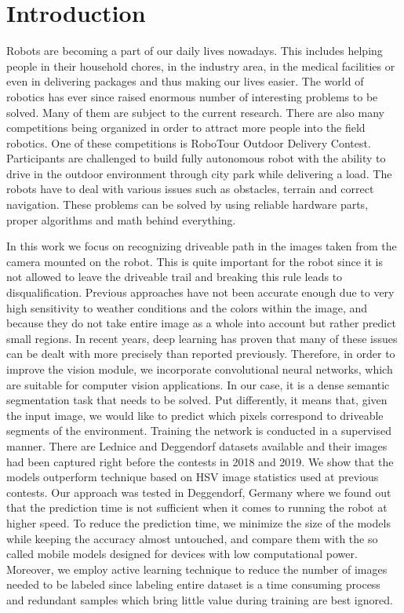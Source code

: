 \chapter*{Introduction} %

Robots are becoming a part of our daily lives nowadays. This includes helping people in
their household chores, in the industry area, in the medical facilities or even in delivering
packages and thus making our lives easier. The world of robotics has ever since raised
enormous number of interesting problems to be solved. Many of them are subject to the current
research. There are also many competitions being organized in order to attract more people into
the field robotics. One of these competitions is RoboTour Outdoor Delivery Contest. Participants
are challenged to build fully autonomous robot with the ability to drive in the
outdoor environment through city park while delivering a load. The robots have to deal
with various issues such as  obstacles, terrain and correct navigation.
These problems can be solved by using reliable hardware parts, proper algorithms and
math behind everything.

In this work we focus on recognizing driveable path in the images taken from
the camera mounted on the robot. This is quite important for the robot since it is not
allowed to leave the driveable trail and breaking this rule leads to disqualification.
Previous approaches have not been accurate enough due to very high sensitivity to
weather conditions and the colors within the image, and because they do not take entire
image as a whole into account but rather predict small regions. In recent years, deep learning
has proven that many of these issues can be dealt with more precisely than reported
previously. Therefore, in order to improve the vision module, we incorporate
convolutional neural networks, which are suitable for computer vision applications. In our case,
it is a dense semantic segmentation task that needs to be solved. Put differently, it means
that, given the
input image, we would like to predict which pixels correspond to driveable segments of the
environment. Training the network is conducted in a supervised manner.
There are Lednice and Deggendorf
datasets available and their images had been captured right before the contests in
2018 and 2019. We show that the models outperform technique based on HSV image statistics
used at previous contests. Our approach was tested in Deggendorf, Germany where
we found out that the prediction time is not sufficient when it comes to running the
robot at higher speed. To reduce the prediction time, we minimize the size of the models
while keeping the accuracy almost untouched, and compare them with the so called mobile
models \cite{bib:howard2017mobilenets, bib:zhang2018shufflenet}
designed for devices with low computational power.
Moreover, we employ active learning technique \cite{bib:settles2009active}
to reduce the number of images needed to be labeled since labeling
entire dataset is a time consuming process and redundant samples which bring little
value during training are best ignored.

